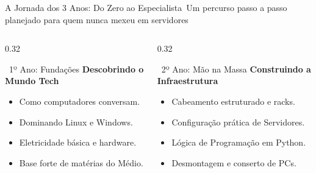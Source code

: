 
\begin{frame}{A Jornada dos 3 Anos: Do Zero ao Especialista}{\faRoute\ Um percurso passo a passo planejado para quem nunca mexeu em servidores}
  \begin{columns}[t]
    \begin{column}{0.32\textwidth}
      \begin{greencard}{\faSeedling\ 1º Ano: Fundações}
        \tiny
        \textbf{Descobrindo o Mundo Tech}
        \begin{itemize}\setlength{\itemsep}{0.12em}
          \item Como computadores conversam.
          \item Dominando Linux e Windows.
          \item Eletricidade básica e hardware.
          \item Base forte de matérias do Médio.
        \end{itemize}
        \vspace{0.06cm}
        \centering{}
      \end{greencard}
    \end{column}
    
    \begin{column}{0.32\textwidth}
      \begin{bluecard}{\faTools\ 2º Ano: Mão na Massa}
        \tiny
        \textbf{Construindo a Infraestrutura}
        \begin{itemize}\setlength{\itemsep}{0.12em}
          \item Cabeamento estruturado e racks.
          \item Configuração prática de Servidores.
          \item Lógica de Programação em Python.
          \item Desmontagem e conserto de PCs.
        \end{itemize}
        \vspace{0.06cm}
        \centering{}
      \end{bluecard}
    \end{column}
    

\end{columns}
\end{frame}
